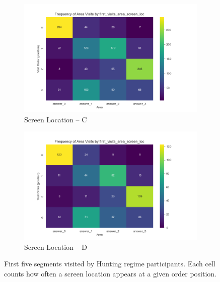 \documentclass[manuscript,review,anonymous]{acmart}
\begin{document}
\begin{figure}[htbp]
          \medskip
        
          \begin{subfigure}{0.48\linewidth}
            \includegraphics[width=\linewidth]{plots/visits/matrix__first_visits_area_screen_loc_hunters_C.png}
            \caption{Screen Location – C}
            \label{fig:hunt_c}
          \end{subfigure}\hfill
          \begin{subfigure}{0.48\linewidth}
            \includegraphics[width=\linewidth]{plots/visits/matrix__first_visits_area_screen_loc_hunters_D.png}
            \caption{Screen Location – D}
            \label{fig:hunt_d}
          \end{subfigure}
        
          \caption{First five segments visited by Hunting regime participants. Each cell counts how often a screen location appears at a given order position.}
          \label{fig:hunt_first_loc}
        \end{figure}
        
\end{document}

